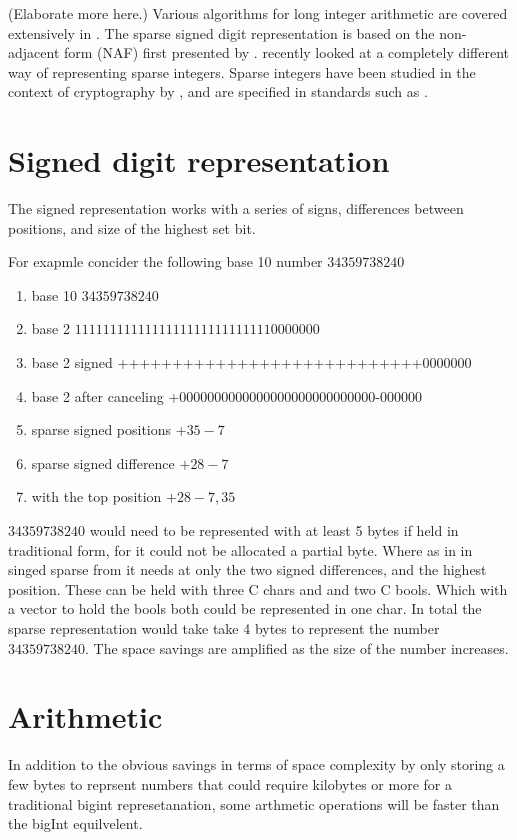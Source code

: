 \documentclass[letterpaper,11pt]{article}
\begin{document}
(Elaborate more here.) Various algorithms for
long integer arithmetic are covered
extensively in \cite{BZ10}. The sparse signed digit representation
is based on the non-adjacent form (NAF) first presented by
\cite{Rei60}. \cite{vui09} recently looked at a completely different
way of representing sparse integers.
Sparse integers have been studied in the context
of cryptography by \cite{bs02}, and are specified in standards such
as \cite{nis09}.

\section{Signed digit representation}
The signed representation works
with a series of signs, differences between positions, and size of the
highest set bit. 

For exapmle concider the following base 10 number $34359738240$
\begin{enumerate}
    \item base 10 $34359738240$
	\item base 2 $11111111111111111111111111110000000$
    \item base 2 signed ++++++++++++++++++++++++++++0000000
    \item base 2 after canceling +0000000000000000000000000000-000000
    \item sparse signed positions $+35 -7$
    \item sparse signed difference $+28 -7$
	\item with the top position $+28 -7, 35$ 
\end{enumerate}
$34359738240$ would need to be represented with at least 5 bytes if held in traditional form, for it could
not be allocated a partial byte.
Where as in in singed sparse from it needs at only the two signed differences, and the highest position.
These can be held with three C chars and and two C bools. Which with a vector to hold the bools both could
be represented in one char. In total the sparse representation would take take 4 bytes to represent the number 
$34359738240$. The space savings are amplified as the size of the number increases.
\section{Arithmetic} 
In addition to the obvious savings in terms of
space complexity by only storing a few bytes to reprsent numbers that could require kilobytes or more for 
a traditional bigint represetanation, some arthmetic operations will be faster than the bigInt equilvelent.
\end{document}
